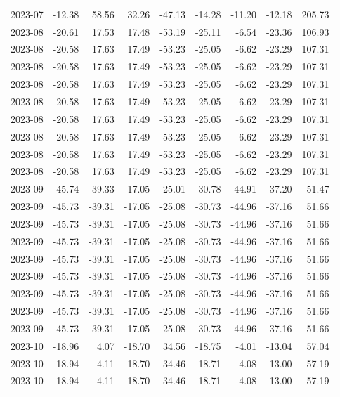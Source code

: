\begin{table}[ht]
\begin{tabular}{lrrrrrrrr}
  2023-07 & -12.38 & 58.56 & 32.26 & -47.13 & -14.28 & -11.20 & -12.18 & 205.73 \\ 
  2023-08 & -20.61 & 17.53 & 17.48 & -53.19 & -25.11 & -6.54 & -23.36 & 106.93 \\ 
  2023-08 & -20.58 & 17.63 & 17.49 & -53.23 & -25.05 & -6.62 & -23.29 & 107.31 \\ 
  2023-08 & -20.58 & 17.63 & 17.49 & -53.23 & -25.05 & -6.62 & -23.29 & 107.31 \\ 
  2023-08 & -20.58 & 17.63 & 17.49 & -53.23 & -25.05 & -6.62 & -23.29 & 107.31 \\ 
  2023-08 & -20.58 & 17.63 & 17.49 & -53.23 & -25.05 & -6.62 & -23.29 & 107.31 \\ 
  2023-08 & -20.58 & 17.63 & 17.49 & -53.23 & -25.05 & -6.62 & -23.29 & 107.31 \\ 
  2023-08 & -20.58 & 17.63 & 17.49 & -53.23 & -25.05 & -6.62 & -23.29 & 107.31 \\ 
  2023-08 & -20.58 & 17.63 & 17.49 & -53.23 & -25.05 & -6.62 & -23.29 & 107.31 \\ 
  2023-08 & -20.58 & 17.63 & 17.49 & -53.23 & -25.05 & -6.62 & -23.29 & 107.31 \\ 
  2023-09 & -45.74 & -39.33 & -17.05 & -25.01 & -30.78 & -44.91 & -37.20 & 51.47 \\ 
  2023-09 & -45.73 & -39.31 & -17.05 & -25.08 & -30.73 & -44.96 & -37.16 & 51.66 \\ 
  2023-09 & -45.73 & -39.31 & -17.05 & -25.08 & -30.73 & -44.96 & -37.16 & 51.66 \\ 
  2023-09 & -45.73 & -39.31 & -17.05 & -25.08 & -30.73 & -44.96 & -37.16 & 51.66 \\ 
  2023-09 & -45.73 & -39.31 & -17.05 & -25.08 & -30.73 & -44.96 & -37.16 & 51.66 \\ 
  2023-09 & -45.73 & -39.31 & -17.05 & -25.08 & -30.73 & -44.96 & -37.16 & 51.66 \\ 
  2023-09 & -45.73 & -39.31 & -17.05 & -25.08 & -30.73 & -44.96 & -37.16 & 51.66 \\ 
  2023-09 & -45.73 & -39.31 & -17.05 & -25.08 & -30.73 & -44.96 & -37.16 & 51.66 \\ 
  2023-09 & -45.73 & -39.31 & -17.05 & -25.08 & -30.73 & -44.96 & -37.16 & 51.66 \\ 
  2023-10 & -18.96 & 4.07 & -18.70 & 34.56 & -18.75 & -4.01 & -13.04 & 57.04 \\ 
  2023-10 & -18.94 & 4.11 & -18.70 & 34.46 & -18.71 & -4.08 & -13.00 & 57.19 \\ 
  2023-10 & -18.94 & 4.11 & -18.70 & 34.46 & -18.71 & -4.08 & -13.00 & 57.19 \\ 

\end{tabular}
\end{table}
